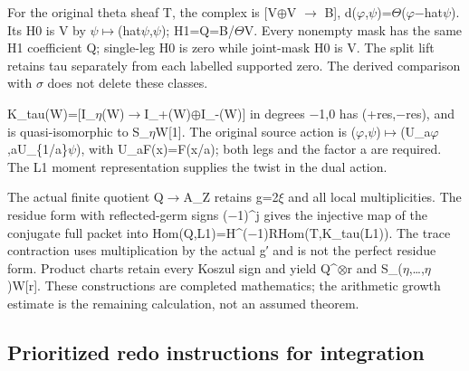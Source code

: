 For the original theta sheaf T, the complex is
[V\allowbreak{}\ensuremath{⊕}\allowbreak{}V
\allowbreak{}\ensuremath{→}\allowbreak{} B{]},
d(\allowbreak{}\ensuremath{φ}\allowbreak{},\allowbreak{}\ensuremath{ψ}\allowbreak{})=\allowbreak{}\ensuremath{Θ}\allowbreak{}(\allowbreak{}\ensuremath{φ}\allowbreak{}\allowbreak{}\ensuremath{−}\allowbreak{}hat\allowbreak{}\ensuremath{ψ}\allowbreak{}).
Its H0 is V by
\allowbreak{}\ensuremath{ψ}\allowbreak{}\allowbreak{}\ensuremath{↦}\allowbreak{}(hat\allowbreak{}\ensuremath{ψ}\allowbreak{},\allowbreak{}\ensuremath{ψ}\allowbreak{});
H1=Q=B/\allowbreak{}\ensuremath{Θ}\allowbreak{}V. Every nonempty mask
has the same H1 coefficient Q; single-leg H0 is zero while joint-mask H0
is V. The split lift retains tau separately from each labelled supported
zero. The derived comparison with
\allowbreak{}\ensuremath{σ}\allowbreak{} does not delete these classes.

K\_tau(W)=[I\_\allowbreak{}\ensuremath{η}\allowbreak{}(W)\allowbreak{}\ensuremath{→}\allowbreak{}I\_+(W)\allowbreak{}\ensuremath{⊕}\allowbreak{}I\_-(W)]
in degrees \allowbreak{}\ensuremath{−}\allowbreak{}1,0 has
(+res,\allowbreak{}\ensuremath{−}\allowbreak{}res), and is
quasi-isomorphic to S\_\allowbreak{}\ensuremath{η}\allowbreak{}W[1]. The
original source action is
(\allowbreak{}\ensuremath{φ}\allowbreak{},\allowbreak{}\ensuremath{ψ}\allowbreak{})\allowbreak{}\ensuremath{↦}\allowbreak{}(U\_a\allowbreak{}\ensuremath{φ}\allowbreak{},aU\_\{1/a\}\allowbreak{}\ensuremath{ψ}\allowbreak{}),
with U\_aF(x)=F(x/a); both legs and the factor a are required. The L1
moment representation supplies the twist in the dual action.

The actual finite quotient Q\allowbreak{}\ensuremath{→}\allowbreak{}A\_Z
retains g=2\allowbreak{}\ensuremath{ξ}\allowbreak{} and all local
multiplicities. The residue form with reflected-germ signs
(\allowbreak{}\ensuremath{−}\allowbreak{}1)\textasciicircum{}j gives the
injective map of the conjugate full packet into
Hom(Q,L1)=H\textasciicircum{}(\allowbreak{}\ensuremath{−}\allowbreak{}1)RHom(T,K\_tau(L1)).
The trace contraction uses multiplication by the actual g′ and is not
the perfect residue form. Product charts retain every Koszul sign and
yield Q\textasciicircum{}\allowbreak{}\ensuremath{⊗}\allowbreak{}r and
S\_(\allowbreak{}\ensuremath{η}\allowbreak{},…,\allowbreak{}\ensuremath{η}\allowbreak{})W[r].
These constructions are completed mathematics; the arithmetic growth
estimate is the remaining calculation, not an assumed theorem.

\subsection{Prioritized redo instructions for
integration}\label{TranscriptLedgerStage:prioritized-redo-instructions-for-integration}

